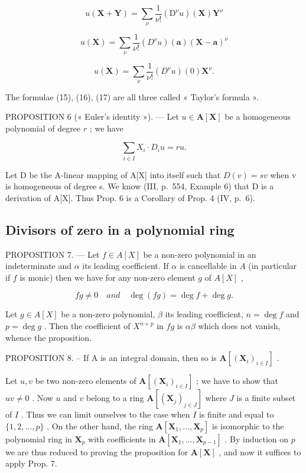 \[
u (\mathbf {X} + \mathbf {Y}) = \sum_ {\nu} \frac {1}{\nu !} (\mathrm{D} ^ {\nu} u) (\mathbf {X}) \mathbf {Y} ^ {\nu}
\]

\[
u (\mathbf {X}) = \sum_ {\nu} \frac {1}{\nu !} (D ^ {\nu} u) (\mathbf {a}) (\mathbf {X} - \mathbf {a}) ^ {\nu}\tag{16}
\]

\[
u (\mathbf {X}) = \sum_ {\nu} \frac {1}{\nu !} (D ^ {\nu} u) (0) \mathbf {X} ^ {\nu}.\tag{17}
\]

The formulae (15), (16), (17) are all three called « Taylor's formula ».

PROPOSITION 6 (« Euler's identity »). --- Let \(u \in \mathbf{A}[\mathbf{X}]\) be a homogeneous polynomial of degree \(r\) ; we have

\[
\sum_ {i \in I} X _ {i} \cdot D _ {i} u = r u.
\]

Let D be the A-linear mapping of A{[}X{]} into itself such that \(D(v) = sv\) when v is homogeneous of degree s. We know (III, p.~554, Example 6) that D is a derivation of A{[}X{]}. Thus Prop. 6 is a Corollary of Prop. 4 (IV, p.~6).

\subsection{Divisors of zero in a polynomial ring}

PROPOSITION 7. --- Let \(f \in A[X]\) be a non-zero polynomial in an indeterminate and \(\alpha\) its leading coefficient. If \(\alpha\) is cancellable in \(A\) (in particular if \(f\) is monic) then we have for any non-zero element \(g\) of \(A[X]\) ,

\[
f g \neq 0 \quad a n d \quad \deg (f g) = \deg f + \deg g.
\]

Let \(g \in A[X]\) be a non-zero polynomial, \(\beta\) its leading coefficient, \(n = \deg f\) and \(p = \deg g\) . Then the coefficient of \(X^{n+p}\) in \(fg\) is \(\alpha\beta\) which does not vanish, whence the proposition.

PROPOSITION 8. -- If A is an integral domain, then so is \(\mathbf{A}[(\mathbf{X}_i)_{i\in I}]\) .

Let \(u, v\) be two non-zero elements of \(\mathbf{A}[(\mathbf{X}_i)_{i \in I}]\) ; we have to show that \(uv \neq 0\) . Now \(u\) and \(v\) belong to a ring \(\mathbf{A}[(\mathbf{X}_j)_{j \in J}]\) where \(J\) is a finite subset of \(I\) . Thus we can limit ourselves to the case when \(I\) is finite and equal to \(\{1, 2, \ldots, p\}\) . On the other hand, the ring \(\mathbf{A}[\mathbf{X}_1, \ldots, \mathbf{X}_p]\) is isomorphic to the polynomial ring in \(\mathbf{X}_p\) with coefficients in \(\mathbf{A}[\mathbf{X}_1, \ldots, \mathbf{X}_{p-1}]\) . By induction on \(p\) we are thus reduced to proving the proposition for \(\mathbf{A}[\mathbf{X}]\) , and now it suffices to apply Prop. 7.

